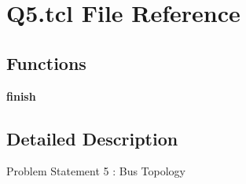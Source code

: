 \hypertarget{Q5_8tcl}{}\section{Q5.\+tcl File Reference}
\label{Q5_8tcl}
\subsection*{Functions}
\begin{DoxyCompactItemize}
\item 
\mbox{\label{Q5_8tcl_a30728837c246b65ef76298af0101d99c}} 
{\bfseries finish}
\end{DoxyCompactItemize}


\subsection{Detailed Description}
Problem Statement 5 \+: Bus Topology

\begin{DoxyVerb}
\end{DoxyVerb}
